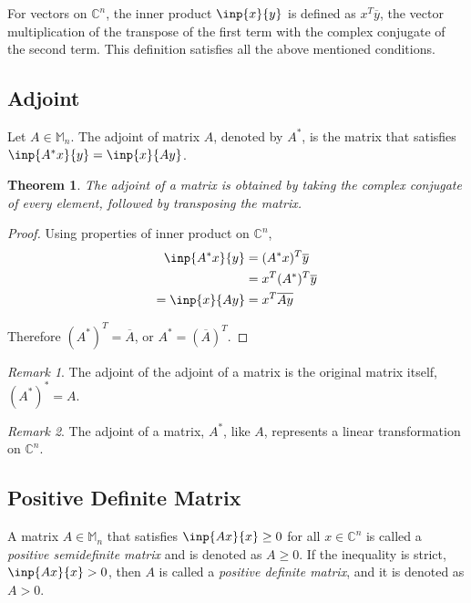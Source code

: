 \documentclass[twofold]{article}
\newcommand*\conj[1]{\overline{#1}}
\newcommand*\adj[1]{#1^*}
\newcommand*\trp[1]{#1^T}
\theoremstyle{plain}
\newtheorem{theorem}{Theorem}
\theoremstyle{definition}
\theoremstyle{remark}
\newtheorem*{remark}{Remark}
\begin{document}
For vectors on \(\mathbb{C}^n\), the inner product \(\inp{x}{y}\) is defined as \(\trp{x} \conj{y}\), the vector multiplication of the transpose of the first term with the complex conjugate of the second term. This definition satisfies all the above mentioned conditions.


\subsection{Adjoint}

Let \(A \in \mathbb{M}_n\). The adjoint of matrix \(A\), denoted by \(\adj{A}\), is the matrix that  satisfies \(\inp{\adj{A}x}{y} = \inp{x}{Ay}\). 

\begin{theorem} The adjoint of a matrix is obtained by taking the complex conjugate of every element, followed by transposing the matrix. \end{theorem}


\begin{proof} Using properties of inner product on \(\mathbb{C}^n\),
\begin{equation*} \begin{split}
\inp{\adj{A}x}{y} & = \trp{(\adj{A}x)} \conj{y}  \\
& = \trp{x} \trp{(\adj{A})} \conj{y}\\
= \inp{x}{Ay} & = \trp{x} \conj{Ay} 
\end{split} \end{equation*}

Therefore \(\trp{(\adj{A})} = \conj{A}\), or \(\adj{A} = \trp{(\conj{A})}\). \end{proof}

\begin{remark} The adjoint of the adjoint of a matrix is the original matrix itself, \(\adj{(\adj{A})} = A\). \end{remark}

\begin{remark} The adjoint of a matrix, \(\adj{A}\), like \(A\), represents a linear transformation on \(\mathbb{C}^n\). \end{remark}


\subsection{Positive Definite Matrix}

A matrix \(A\in \mathbb{M}_n\) that satisfies \(\inp{Ax}{x} \ge 0\) for all \(x \in \mathbb{C}^n\) is called a {\em positive semidefinite matrix} and is denoted as \(A \ge 0\). If the inequality is strict, \(\inp{Ax}{x} > 0\), then \(A\) is called a {\em positive definite matrix}, and it is denoted as \(A > 0\). 
\end{document}
